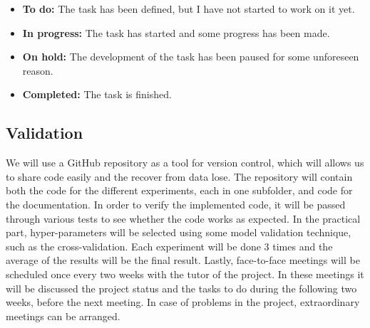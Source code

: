 \begin{itemize}
    \item \textbf{To do:} The task has been defined, but I have not started to work on it yet.
    \item \textbf{In progress:} The task has started and some progress has been made.
    \item \textbf{On hold:} The development of the task has been paused for some unforeseen reason.
    \item \textbf{Completed:} The task is finished.
\end{itemize}

\subsection{Validation}

We will use a GitHub repository as a tool for version control, which will allows us to share code easily and the recover from data lose. The repository will contain both the code for the different experiments, each in one subfolder, and code for the documentation. In order to verify the implemented code, it will be passed through various tests to see whether the code works as expected. In the practical part, hyper-parameters will be selected using some model validation technique, such as the cross-validation. Each experiment will be done 3 times and the average of the results will be the final result. Lastly, face-to-face meetings will be scheduled once every two weeks with the tutor of the project. In these meetings it will be discussed the project status and the tasks to do during the following two weeks, before the next meeting. In case of problems in the project, extraordinary meetings can be arranged.
